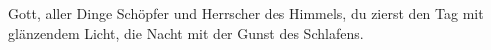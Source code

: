 \medskip


\def\greinitialformat#1{{\fontsize{40}{40}\selectfont #1}}
\gresetfirstlineaboveinitial{\small \textcolor{red}{hieme}}{}
\setaboveinitialseparation{0.72mm}

\medskip

\begin{sloppypar}
{\noindent\rm{ Gott, aller Dinge Schöpfer und Herrscher des Himmels,
du zierst den Tag mit glänzendem Licht, die Nacht mit der Gunst des Schlafens.}}
\end{sloppypar}

\medskip


